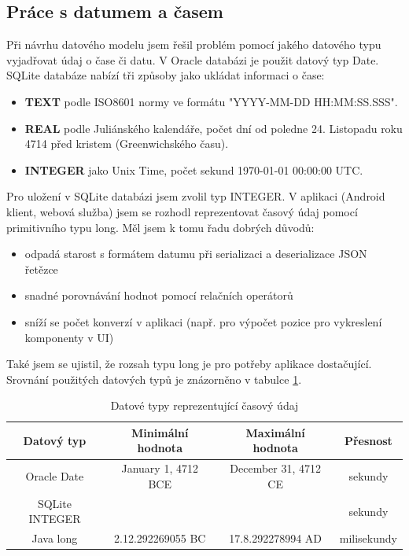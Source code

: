 \documentclass{diplomka}
\begin{document}
\subsection{Práce s datumem a časem}
Při návrhu datového modelu jsem řešil problém pomocí jakého datového typu vyjadřovat údaj o čase či datu. V Oracle databázi je použit datový typ Date. SQLite databáze nabízí tři způsoby jako ukládat informaci o čase:
\begin{itemize}
\item \textbf{TEXT} podle ISO8601 normy ve formátu "YYYY-MM-DD HH:MM:SS.SSS".
\item \textbf{REAL} podle Juliánského kalendáře, počet dní od poledne 24. Listopadu roku 4714 před kristem (Greenwichského času).
\item \textbf{INTEGER} jako Unix Time, počet sekund 1970-01-01 00:00:00 UTC.
\end{itemize}

\noindent
Pro uložení v SQLite databázi jsem zvolil typ INTEGER. V aplikaci (Android klient, webová služba) jsem se rozhodl reprezentovat časový údaj pomocí primitivního typu long. Měl jsem k tomu řadu dobrých důvodů:
\begin{itemize}
\item odpadá starost s formátem datumu při serializaci a deserializace JSON řetězce
\item snadné porovnávání hodnot pomocí relačních operátorů
\item sníží se počet konverzí v aplikaci (např. pro výpočet pozice pro vykreslení komponenty v UI)
\end{itemize}

Také jsem se ujistil, že rozsah typu long je pro potřeby aplikace dostačující. Srovnání použitých datových typů je znázorněno v tabulce \ref{tab:cas}. 

\begin{table}[H]
\centering
\begin{tabular}{| c | c | c | c |}
\hline
Datový typ &  Minimální hodnota & Maximální hodnota & Přesnost \\ \hline
Oracle Date &   January 1, 4712 BCE  &  December 31, 4712 CE &  sekundy \\ \hline
SQLite INTEGER &    &  &  sekundy \\ \hline
Java long & 2.12.292269055 BC   & 17.8.292278994 AD &  milisekundy \\ \hline
\end{tabular}
\caption{Datové typy reprezentující časový údaj}
\label{tab:cas}
\end{table}
\end{document}
